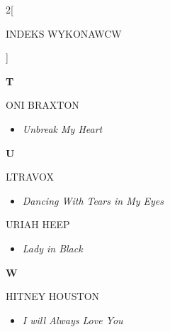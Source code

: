 \documentclass[a4paper]{report}
\begin{document}
\begin{multicols*}{2}[\begin{Huge}INDEKS WYKONAWCW\end{Huge}\vspace{1cm}]
\begin{minipage}{\columnwidth}
	\begin{Large}\textbf{T}\end{Large}ONI BRAXTON 
	\begin{itemize}[topsep=3pt, after=\vspace{3mm}]
		\itemsep0em
		\item[]\textit{Unbreak My Heart}  \\
	\end{itemize}
\end{minipage}
\begin{minipage}{\columnwidth}
	\begin{Large}\textbf{U}\end{Large}LTRAVOX 
	\begin{itemize}[topsep=3pt, after=\vspace{3mm}]
		\itemsep0em
		\item[]\textit{Dancing With Tears in My Eyes}  \\
	\end{itemize}
\end{minipage}
\begin{minipage}{\columnwidth}
	URIAH HEEP 
	\begin{itemize}[topsep=3pt, after=\vspace{3mm}]
		\itemsep0em
		\item[]\textit{Lady in Black}  \\
	\end{itemize}
\end{minipage}
\begin{minipage}{\columnwidth}
	\begin{Large}\textbf{W}\end{Large}HITNEY HOUSTON 
	\begin{itemize}[topsep=3pt, after=\vspace{3mm}]
		\itemsep0em
		\item[]\textit{I will Always Love You}  \\
	\end{itemize}
\end{minipage}



\end{multicols*}
\end{document}
